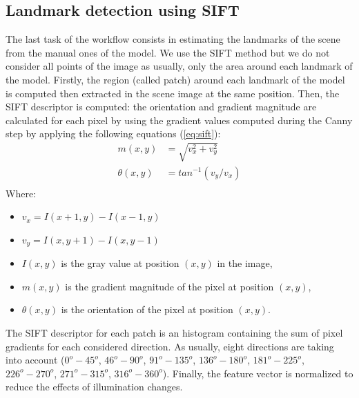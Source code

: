 \documentclass[twoside,twocolumn,10pt]{article}
\begin{document}
\subsection{Landmark detection using SIFT}

The last task of the workflow consists in estimating the landmarks of the scene from the manual ones of the model.
We use the SIFT method \cite{lowe2004distinctive} but we do not consider all points of the image as usually, only the area around each landmark of the model.
Firstly, the region (called patch) around each landmark of the model is computed then extracted in the scene image at the same position.
Then, the SIFT descriptor is computed: the orientation and gradient magnitude are calculated for each pixel by using the gradient values computed during the Canny step by applying the following equations (\ref{eq:sift}):
\begin{equation}
\label{eq:sift}
\begin{split}
	m(x,y) &= \sqrt{v_x^2 + v_y^2} \\
	\theta(x,y)& = tan^{-1}(v_y/v_x) \\
\end{split}
\end{equation}
Where:
\begin{itemize}[nosep,label=\footnotesize$\bullet$]
	\item $v_x = I(x+1,y) - I(x-1,y)$
	\item $v_y = I(x,y+1) - I(x,y-1)$
	\item $I(x,y)$ is the gray value at position $(x,y)$ in the image,
	\item $m(x,y)$ is the gradient magnitude of the pixel at position $(x,y)$,
	\item $\theta(x,y)$ is the orientation of the pixel at position $(x,y)$.
\end{itemize}
The SIFT descriptor for each patch is an histogram containing the sum of pixel gradients for each considered direction.
As usually, eight directions are taking into account ($0^o - 45^o$, $46^o - 90^o$, $91^o - 135^o$, $136^o - 180^o$, $181^o - 225^o$, $226^o - 270^o$, $271^o - 315^o$, $316^o - 360^o$). Finally, the feature vector is normalized to reduce the effects of illumination changes.
\end{document}

